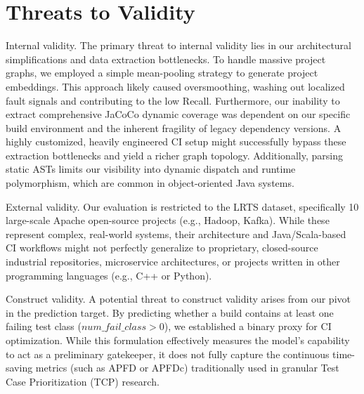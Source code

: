 \section{Threats to Validity}

Internal validity. The primary threat to internal validity lies in our architectural simplifications and data extraction bottlenecks. To handle massive project graphs, we employed a simple mean-pooling strategy to generate project embeddings. This approach likely caused oversmoothing, washing out localized fault signals and contributing to the low Recall. Furthermore, our inability to extract comprehensive JaCoCo dynamic coverage was dependent on our specific build environment and the inherent fragility of legacy dependency versions. A highly customized, heavily engineered CI setup might successfully bypass these extraction bottlenecks and yield a richer graph topology. Additionally, parsing static ASTs limits our visibility into dynamic dispatch and runtime polymorphism, which are common in object-oriented Java systems.

External validity. Our evaluation is restricted to the LRTS dataset, specifically 10 large-scale Apache open-source projects (e.g., Hadoop, Kafka). While these represent complex, real-world systems, their architecture and Java/Scala-based CI workflows might not perfectly generalize to proprietary, closed-source industrial repositories, microservice architectures, or projects written in other programming languages (e.g., C++ or Python).

Construct validity. A potential threat to construct validity arises from our pivot in the prediction target. By predicting whether a build contains at least one failing test class ($num\_fail\_class > 0$), we established a binary proxy for CI optimization. While this formulation effectively measures the model's capability to act as a preliminary gatekeeper, it does not fully capture the continuous time-saving metrics (such as APFD or APFDc) traditionally used in granular Test Case Prioritization (TCP) research.
